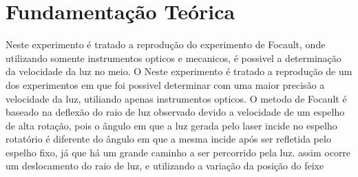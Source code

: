 \section{Fundamentação Teórica}
Neste experimento é tratado a reprodução do experimento de Focault, onde utilizando somente instrumentos opticos e mecanicos, é possivel a determinação da velocidade da luz no meio.
O 
Neste experimento é tratado a reprodução de um dos experimentos em que foi possivel determinar com uma maior precisão a velocidade da luz, utiliando apenas instrumentos opticos. O metodo de Focault é baseado na deflexão do raio de luz observado devido a velocidade de um espelho de alta rotação, pois o ângulo em que a luz gerada pelo laser incide no espelho rotatório é diferente do ângulo em que a mesma incide após ser refletida pelo espelho fixo, já que há um grande caminho a ser percorrido pela luz. assim ocorre um deslocamento do raio de luz, e utilizando a variação da posição do feixe 
